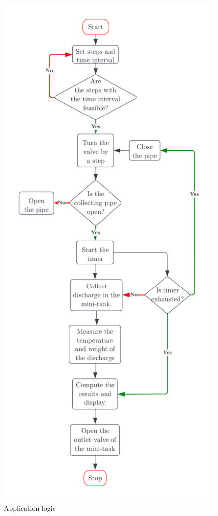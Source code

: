 \begin{figure}
    \centering
    \includegraphics[width=\textwidth,height=\textheight,keepaspectratio]{Figures/Control_flow.png}
    \caption{Application logic}
    \label{fig:control_flow}
\end{figure}


